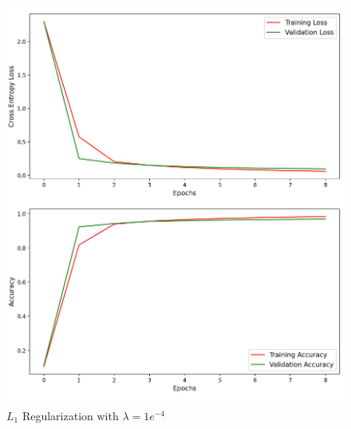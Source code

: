 \begin{figure}[H]
	\centering
	\includegraphics[width=1.0\textwidth]{./images/l1_e4.png}
	\caption{$L_1$ Regularization with $\lambda = 1e^{-4}$}
	\label{fig:l1_1e4}
\end{figure}

